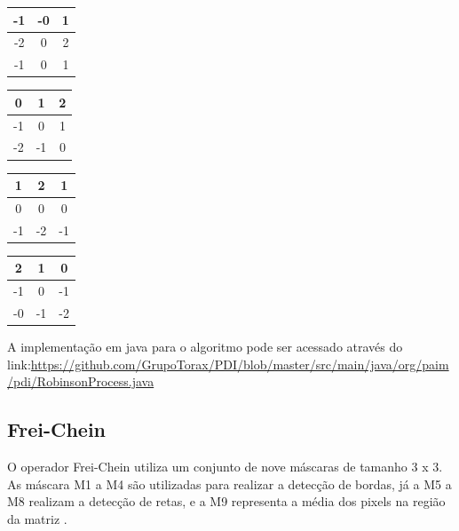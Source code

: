 \documentclass[
	12pt,				%
	oneside,			%
	a4paper,			%
	english,			%
	french,				%
	spanish,			%
	brazil,				%
	]{abntex2}
\begin{document}
\begin{tabular}{|c|c|c|}
    \hline
    -1 & -0 &  1   \\ \hline
	-2 &  0 &  2   \\ \hline   
	-1 &  0 &  1   \\ \hline   
\end{tabular}
\begin{tabular}{|c|c|c|}
    \hline
     0 &  1 &  2   \\ \hline
	-1 &  0 &  1   \\ \hline   
	-2 & -1 &  0   \\ \hline   
\end{tabular}
\begin{tabular}{|c|c|c|}
    \hline
     1 &  2 &  1   \\ \hline
	 0 &  0 &  0   \\ \hline   
	-1 & -2 & -1   \\ \hline   
\end{tabular}
\begin{tabular}{|c|c|c|}
    \hline
     2 &  1 &  0   \\ \hline
	-1 &  0 & -1   \\ \hline   
	-0 & -1 & -2   \\ \hline   
\end{tabular}


A implementação em java para o algoritmo pode ser acessado através do link:\url{https://github.com/GrupoTorax/PDI/blob/master/src/main/java/org/paim/pdi/RobinsonProcess.java}

\subsection{Frei-Chein}
O operador Frei-Chein utiliza um conjunto de nove máscaras de tamanho 3 x 3. As máscara M1 a M4 são utilizadas para realizar a detecção de bordas, já a M5 a M8 realizam a detecção de retas, e a M9 representa a média dos pixels na região da matriz \cite{pedriniSchwartz:2008}. 
\end{document}
